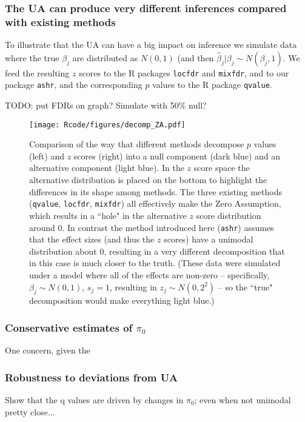 \documentclass[11pt]{article}
\def\bhat{\hat{\beta}}
\def\qvalue{{\tt qvalue}\xspace}
\def\locfdr{{\tt locfdr}\xspace}
\def\mixfdr{{\tt mixfdr}\xspace}
\def\ashr{{\tt ashr}\xspace}
\begin{document}
\subsubsection{The UA can produce very different inferences compared with existing methods}

To illustrate that the UA can have a big impact on inference 
we simulate data where the true $\beta_j$ are distributed as $N(0,1)$ (and then $\bhat_j | \beta_j \sim N(\beta_j,1)$.
We feed the resulting $z$ scores to the R packages \locfdr and \mixfdr, and to our package \ashr, and the corresponding $p$ values to the R package \qvalue.

TODO: put FDRs on graph? Simulate with 50\% null?

\begin{figure}
\center \texttt{[image: Rcode/figures/decomp\_ZA.pdf]}
\caption{Comparison of the way that different methods decompose $p$ values (left) and $z$ scores (right) into a null component (dark blue) and an alternative component (light blue). In the $z$ score space the alternative distribution is placed on the bottom to highlight the differences in its shape among methods.
The three existing methods (\qvalue, \locfdr, \mixfdr) all effectively make the Zero Assumption, which results in a ``hole" in the alternative $z$ score distribution around 0.
In contrast the method introduced here (\ashr) assumes that the effect sizes (and thus the $z$ scores) have a unimodal distribution about 0, resulting in a very different decomposition that in this case is much closer to the truth. (These data were simulated under a model where all of the effects are non-zero -- specifically, $\beta_j \sim N(0,1)$, $s_j=1$, resulting in $z_j \sim N(0,2^2)$ -- so the ``true" decomposition would make everything light blue.)} \label{fig:ZA}
\end{figure}

\subsubsection*{Conservative estimates of $\pi_0$}

One concern, given the 


\subsubsection*{Robustness to deviations from UA}

Show that the q values are driven by changes in $\pi_0$; even when not unimodal pretty close...
\end{document}
